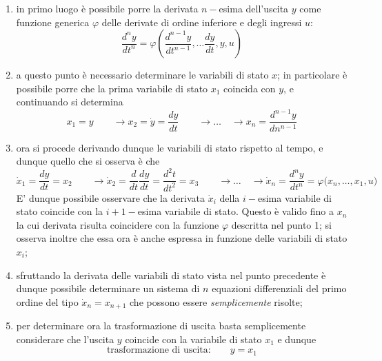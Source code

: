  		\begin{enumerate}
 			\item in primo luogo è possibile porre la derivata $n-$esima dell'uscita $y$ come funzione generica $\varphi$ delle derivate di ordine inferiore e degli ingressi $u$:
 			\[ \frac{d^n y}{dt^n} = \varphi \left( \frac{d^{n-1} y}{dt^{n-1}}, \dots \frac{d y}{dt} , y , u  \right)  \]
 			
 			\item a questo punto è necessario determinare le variabili di stato $x$; in particolare è possibile porre che la prima variabile di stato $x_1$ coincida con $y$, e continuando si determina
 			\[ x_1 = y \qquad \rightarrow x_2 = \dot y = \frac{dy}{dt} \qquad \rightarrow \dots \quad \rightarrow x_n = \frac{d^ {n-1} y}{dn^{n-1}}  \]
 			
 			\item ora si procede derivando dunque le variabili di stato rispetto al tempo, e dunque quello che si osserva è che
 			\[ \dot x_1 = \frac{dy}{dt} = x_2 \qquad \rightarrow \dot x_2 = \frac{d}{dt}  \frac{dy}{dt} = \frac{d^2t}{dt^2} = x_3 \qquad  \rightarrow\dots \quad \rightarrow \dot x_n = \frac{d^n y}{dt^n} = \varphi \big(x_n, \dots, x_1, u\big)\]
 			E' dunque possibile osservare che la derivata $\dot x_i$ della $i-$esima variabile di stato coincide con la $i+1-$esima variabile di stato. Questo è valido fino a $x_n$ la cui derivata risulta coincidere con la funzione $\varphi$ descritta nel punto 1; si osserva inoltre che essa ora è anche espressa in funzione delle variabili di stato $x_i$;
 			
 			\item  sfruttando la derivata delle variabili di stato vista nel punto precedente è dunque possibile determinare un sistema di $n$ equazioni differenziali del primo ordine del tipo $\dot x_n = x_{n+1}$ che possono essere \textit{semplicemente} risolte;
 			
 			\item per determinare ora la trasformazione di uscita basta semplicemente considerare che l'uscita $y$ coincide con la variabile di stato $x_1$ e dunque
 			\[\textrm{trasformazione di uscita:} \qquad y = x_1 \]
 			
 			
 			
 		\end{enumerate}
 	
